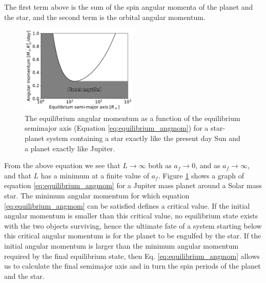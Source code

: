 The first term above is the sum of the spin angular momenta of the planet and
the star, and the second term is the orbital angular momentum.

\begin{figure}[t]
%
    \centering
%
    \includegraphics[width=0.5\textwidth]{equilibrium_angmom.pdf}
%
    \caption{
%
        The equilibrium angular momentum as a function of the equilibrium
        semimajor axis (Equation \eqref{eq:equilibrium_angmom}) for a
        star-planet system containing a star exactly like the present day Sun
        and a planet exactly like Jupiter.
%
    }
%
    \label{fig:equilibrium_angmom}
%
\end{figure}


From the above equation we see that $L \rightarrow \infty$ both as $a_f
\rightarrow 0$, and as $a_f \rightarrow \infty$, and that $L$ has a minimum
at a finite value of $a_f$. Figure \ref{fig:equilibrium_angmom} shows a graph of
equation \eqref{eq:equilibrium_angmom} for a Jupiter mass planet around a Solar
mass star. The minimum angular momentum for which equation
\eqref{eq:equilibrium_angmom} can be satisfied defines a critical value.  If the
initial angular momentum is smaller than this critical value, no equilibrium
state exists with the two objects surviving, hence the ultimate fate of a system
starting below this critical angular momentum is for the planet to be engulfed
by the star. If the initial angular momentum is larger than the minimum angular
momentum required by the final equilibrium state, then Eq.
\eqref{eq:equilibrium_angmom} allows us to calculate the final semimajor axis
and in turn the spin periods of the planet and the star.

